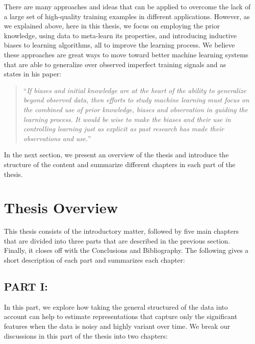 There are many approaches and ideas that can be applied to overcome the lack of a large set of high-quality training examples in different applications. However, as we explained above, here in this thesis, we focus on employing the prior knowledge, using data to meta-learn its properties, and introducing inductive biases to learning algorithms, all to improve the learning process. We believe these approaches are great ways to move toward better machine learning systems that are able to generalize over observed imperfect training signals and as ~\citet{Mitchell80theneed} states in his paper:
\begin{quote}
``\emph{If biases and initial knowledge are at the heart of the ability to generalize beyond observed data, then efforts to study machine learning must focus on the combined use of prior knowledge, biases and observation in guiding the learning process. It would be wise to make the biases and their use in controlling learning just as explicit as past research has made their observations and use.}''
\end{quote}

In the next section, we present an overview of the thesis and introduce the structure of the content and summarize different chapters in each part of the thesis.

\section{Thesis Overview}
This thesis consists of the introductory matter, followed by five main
chapters that are divided into three parts that are described in the previous section. Finally, it closes off with the Conclusions and Bibliography. 
The following gives a short description of each part and summarizes each chapter: 

\subsection*{PART I: }
In this part, we explore how taking the general structured of the data into account can help to estimate representations that capture only the significant features when the data is noisy and highly variant over time. We break our discussions in this part of the thesis into two chapters:

